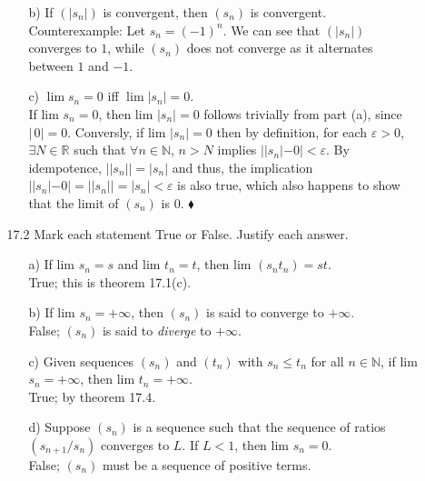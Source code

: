 \documentclass[12pt]{article}
\begin{document}
\begin{enumerate}
\begin{enumerate}
\begin{enumerate}
\item[b)] If $(|s_n|)$ is convergent, then $(s_n)$ is convergent.\\
Counterexample: Let $s_n = (-1)^n$. We can see that $(|s_n|)$ converges to $1$, 
while $(s_n)$ does not converge as it alternates between $1$ and $-1$.

\item[c)] $\lim s_n = 0$ iff $\lim |s_n| = 0$. \\
If lim $s_n = 0$, then lim $|s_n| = 0$ follows trivially from part (a), since $|\,0| = 0$.
Conversly, if lim $|s_n| = 0$ then by definition, for each $\varepsilon > 0$, 
$\exists N \in \mathbb{R}$ such that $\forall n \in \mathbb{N}$, $n > N$ implies
$||s_n| - 0| < \varepsilon$. By idempotence, $||s_n|| = |s_n|$ and thus, 
the implication $||s_n| - 0| = ||s_n|| = |s_n| < \varepsilon$ is also true, 
which also happens to show that the limit of $(s_n)$ is $0$. $\blacklozenge$
\end{enumerate}

\item[17.2] Mark each statement True or False. Justify each answer.
\begin{enumerate}
\item[a)] If lim $s_n = s$ and lim $t_n = t$, then lim $(s_nt_n) = st$. \\
True; this is theorem 17.1(c).
\item[b)] If lim $s_n = +\infty$, then $(s_n)$ is said to converge to $+\infty$.\\
False; $(s_n)$ is said to \emph{diverge} to $+\infty$.
\item[c)] Given sequences $(s_n)$ and $(t_n)$ with $s_n \leq t_n$ for all $n \in \mathbb{N}$, if lim $s_n = +\infty$, then lim $t_n = +\infty$. \\
True; by theorem 17.4.
\item[d)] Suppose $(s_n)$ is a sequence such that the sequence of ratios $(s_{n+1}/s_n)$ converges to $L$. If $L < 1$, then lim $s_n = 0$. \\
False; $(s_n)$ must be a sequence of positive terms.
\end{enumerate}


\end{enumerate}
\end{enumerate}
\end{document}
